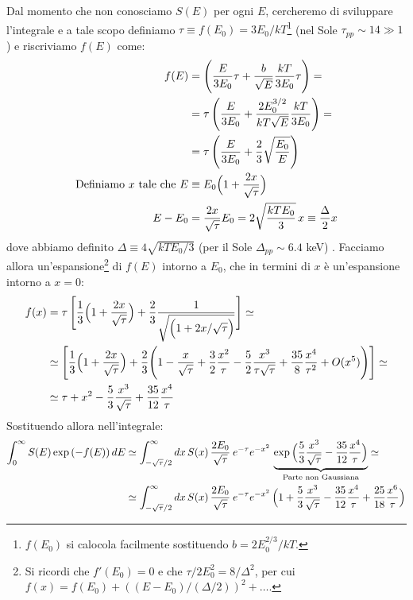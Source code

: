 Dal momento che non conosciamo $S(E)$ per ogni $E$, cercheremo di sviluppare l'integrale e a tale scopo definiamo $\tau\equiv f(E_0)= 3E_0/kT$\footnote{$f(E_0)$ si calocola facilmente sostituendo $b=2E_0^{2/3}/kT$.} (nel Sole $\tau_{pp}\sim 14\gg 1$) e riscriviamo $f(E)$ come:
\begin{displaymath}
\begin{aligned}
f(E) &= \Biggl ( \frac{E}{3E_0}\tau + \frac{b}{\sqrt{E}}\frac{kT}{3E_0} \tau \Biggr ) =\\
&= \tau \, \Biggl ( \frac{E}{3E_0} + \frac{2E_0^{3/2}}{kT \sqrt{E}}\frac{kT}{3E_0} \Biggr ) =\\
&= \tau \, \Biggl ( \frac{E}{3E_0} + \frac{2}{3}\sqrt{\frac{E_0}{E}} \Biggr )\\
\text{Definiamo } x \text{ tale che } E&\equiv E_0 \Bigl ( 1+\frac{2x}{\sqrt{\tau}} \Bigr )\\
E-E_0 &= \frac{2x}{\sqrt{\tau}}E_0 = 2\sqrt{\frac{kTE_0}{3}}\,x \equiv \frac{\Delta}{2} x
\end{aligned}
\end{displaymath}
dove abbiamo definito $\Delta \equiv 4\sqrt{kTE_0/3}$ (per il Sole $\Delta_{pp}\sim 6.4$ keV)%
. Facciamo allora un'espansione\footnote{Si ricordi che $f'(E_0)=0$ e che $\tau/2E_0^2 = 8/\Delta^2$, per cui $f(x) = f(E_0) + ((E-E_0)/(\Delta/2))^2 + \dots$.} di $f(E)$ intorno a $E_0$, che in termini di $x$ è un'espansione intorno a $x=0$:
\begin{displaymath}
\begin{aligned}
f(x) &= \tau \, \Biggl [ \frac{1}{3} \Bigl ( 1+\frac{2x}{\sqrt{\tau}} \Bigr ) + \frac{2}{3} \frac{1}{\sqrt{\Bigl ( 1+2x/\sqrt{\tau} \Bigr )}} \Biggr ] \simeq\\
&\simeq \Biggl [ \frac{1}{3} \Bigl ( 1+\frac{2x}{\sqrt{\tau}} \Bigr ) + \frac{2}{3} \Biggl ( 1-\frac{x}{\sqrt{\tau}} +\frac{3}{2}\frac{x^2}{\tau} - \frac{5}{2} \frac{x^3}{\tau\sqrt{\tau}}+\frac{35}{8}\frac{x^4}{\tau^2}+ O(x^5) \Biggr )  \Biggr ] \simeq \\
&\simeq \tau  + x^2 - \frac{5}{3} \frac{x^3}{\sqrt{\tau}} + \frac{35}{12}\frac{x^4}{\tau}
\end{aligned}
\end{displaymath}
Sostituendo allora nell'integrale:
\begin{displaymath}
\begin{aligned}
\int_0^\infty S(E) \exp{(-f(E))}\,dE &\simeq \int_{-\sqrt{\tau}/2}^\infty dx\, S(x) \, \frac{2E_0}{\sqrt{\tau}} \: e^{-\tau} e^{-x^2} \, \underbrace{\exp{\Bigl ( \frac{5}{3} \frac{x^3}{\sqrt{\tau}} - \frac{35}{12}\frac{x^4}{\tau} \Bigr )}}_\text{Parte non Gaussiana} \simeq \\
&\simeq  \int_{-\sqrt{\tau}/2}^\infty dx\, S(x) \, \frac{2E_0}{\sqrt{\tau}} \: e^{-\tau} e^{-x^2} \, \Bigl ( 1+\frac{5}{3} \frac{x^3}{\sqrt{\tau}} - \frac{35}{12}\frac{x^4}{\tau} + \frac{25}{18} \frac{x^6}{\tau} \Bigr )
\end{aligned}
\end{displaymath}
